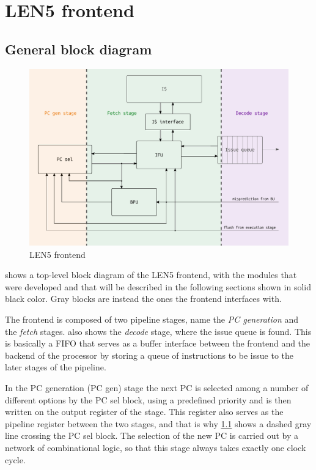 \chapter{LEN5 frontend}
\section{General block diagram}
\begin{figure}[hbt]
  \centering
  \includegraphics[width=\textwidth]{img/frontend.pdf}
  \caption{LEN5 frontend}
  \label{fig:frontend}
\end{figure}
 shows a top-level block diagram of the LEN5 frontend, with the modules that were developed and that will be described in the following sections shown in solid black color. Gray blocks are instead the ones the frontend interfaces with.

The frontend is composed of two pipeline stages, name the \emph{\ac{PC} generation} and the \emph{fetch} stages.  also shows the \emph{decode} stage, where the issue queue is found. This is basically a \acs{FIFO} that serves as a buffer interface between the frontend and the backend of the processor by storing a queue of instructions to be issue to the later stages of the pipeline.

In the \ac{PC} generation (\ac{PC} gen) stage the next \ac{PC} is selected among a number of different options by the \ac{PC} sel block, using a predefined priority and is then written on the output register of the stage. This register also serves as the pipeline register between the two stages, and that is why \cref{fig:frontend} shows a dashed gray line crossing the \ac{PC} sel block. The selection of the new \ac{PC} is carried out by a network of combinational logic, so that this stage always takes exactly one clock cycle.

